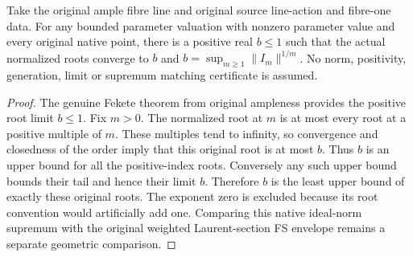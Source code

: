 \begin{theorem}\label{thm:native-test-configuration-normalized-supremum}
\leanok
{}
Take the original ample fibre line and original source line-action and
fibre-one data. For any bounded parameter valuation with nonzero parameter
value and every original native point, there is a positive real $b\leq1$
such that the actual normalized roots converge to $b$ and
$b=\sup_{m\geq1}\|I_m\|^{1/m}$.
No norm, positivity, generation, limit or supremum matching certificate
is assumed.
\end{theorem}
\begin{proof}
The genuine Fekete theorem from original ampleness provides the positive
root limit $b\leq1$. Fix $m>0$. The normalized root at $m$ is at most
every root at a positive multiple of $m$. These multiples tend to infinity,
so convergence and closedness of the order imply that this original root
is at most $b$. Thus $b$ is an upper bound for all the positive-index
roots. Conversely any such upper bound bounds their tail and hence their
limit $b$. Therefore $b$ is the least upper bound of exactly these original
roots. The exponent zero is excluded because its root convention would
artificially add one. Comparing this native ideal-norm supremum with the
original weighted Laurent-section FS envelope remains a separate geometric
comparison.
\end{proof}
